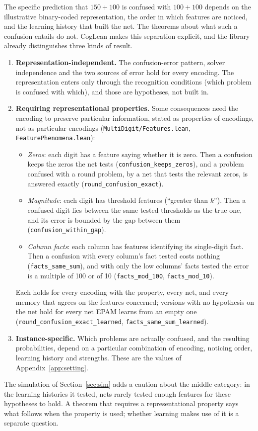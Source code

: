 \documentclass[11pt]{article}
\newcommand{\code}[1]{\texttt{#1}}
\newcommand{\lean}[1]{\texttt{#1}}
\begin{document}
The specific prediction that $150+100$ is confused with $100+100$ depends on the illustrative binary-coded representation, the order in which features are noticed, and the learning history that built the net. The theorems about what such a confusion entails do not. CogLean makes this separation explicit, and the library already distinguishes three kinds of result.
\begin{enumerate}
  \item \textbf{Representation-independent.} The confusion-error pattern, solver independence and the two sources of error hold for every encoding. The representation enters only through the recognition conditions (which problem is confused with which), and those are hypotheses, not built in.
  \item \textbf{Requiring representational properties.} Some consequences need the encoding to preserve particular information, stated as properties of encodings, not as particular encodings (\code{MultiDigit/Features.lean}, \code{FeaturePhenomena.lean}):
  \begin{itemize}
    \item \emph{Zeros}: each digit has a feature saying whether it is zero. Then a confusion keeps the zeros the net tests (\lean{confusion\_keeps\_zeros}), and a problem confused with a round problem, by a net that tests the relevant zeros, is answered exactly (\lean{round\_confusion\_exact}).
    \item \emph{Magnitude}: each digit has threshold features (``greater than $k$''). Then a confused digit lies between the same tested thresholds as the true one, and its error is bounded by the gap between them (\lean{confusion\_within\_gap}).
    \item \emph{Column facts}: each column has features identifying its single-digit fact. Then a confusion with every column's fact tested costs nothing (\lean{facts\_same\_sum}), and with only the low columns' facts tested the error is a multiple of 100 or of 10 (\lean{facts\_mod\_100}, \lean{facts\_mod\_10}).
  \end{itemize}
  Each holds for every encoding with the property, every net, and every memory that agrees on the features concerned; versions with no hypothesis on the net hold for every net EPAM learns from an empty one (\lean{round\_confusion\_exact\_learned}, \lean{facts\_same\_sum\_learned}).
  \item \textbf{Instance-specific.} Which problems are actually confused, and the resulting probabilities, depend on a particular combination of encoding, noticing order, learning history and strengths. These are the values of Appendix~\ref{app:setting}.
\end{enumerate}
The simulation of Section~\ref{sec:sim} adds a caution about the middle category: in the learning histories it tested, nets rarely tested enough features for these hypotheses to hold. A theorem that requires a representational property says what follows when the property is used; whether learning makes use of it is a separate question.
\end{document}
